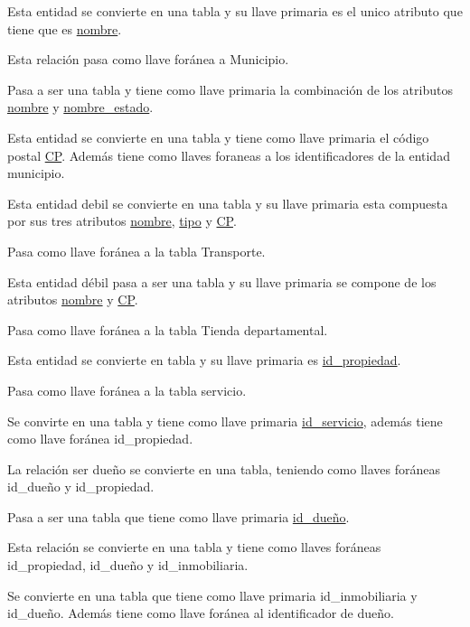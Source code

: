 \documentclass[10pt]{article}
\begin{document}
    \begin{description}[leftmargin=9em,style=nextline]
    	\item[Estado] Esta entidad se convierte en una tabla y su llave primaria es el unico atributo que tiene que es \underline{nombre}.
    	\item[Estar] Esta relación pasa como llave foránea a Municipio. 
    	\item[Municipio] Pasa a ser una tabla y tiene como llave primaria la combinación de los atributos \underline{nombre} y \underline{nombre\_estado}.
    	\item[Colonia]  Esta entidad se convierte en una tabla y tiene como llave primaria el código postal \underline{CP}. Además tiene como llaves foraneas a los identificadores de la entidad municipio.
    	\item[Transporte] Esta entidad debil se convierte en una tabla y su llave primaria esta compuesta por sus tres atributos \underline{nombre}, \underline{tipo} y \underline{CP}.
    	\item[Tener transporte] Pasa como llave foránea a la tabla Transporte.
    	\item[Tienda departamental] Esta entidad débil pasa a ser una tabla y su llave primaria se compone de los atributos \underline{nombre} y \underline{CP}.
    	\item[Tener tienda] Pasa como llave foránea a la tabla Tienda departamental.
    	\item[Propiedad] Esta entidad se convierte en tabla y su llave primaria es \underline{id\_propiedad}.
    	\item[Contar] Pasa como llave foránea a la tabla servicio.
    	\item[Servicio] Se convirte en una tabla y tiene como llave primaria \underline{id\_servicio}, además tiene como llave foránea id\_propiedad.
        \item[Ser dueño] La relación ser dueño se convierte en una tabla, teniendo como llaves foráneas id\_dueño y id\_propiedad.
   	    \item[Dueño] Pasa a ser una tabla que tiene como llave primaria \underline{id\_dueño}.
   	    \item[Revender] Esta relación se convierte en una tabla y tiene como llaves foráneas id\_propiedad, id\_dueño y id\_inmobiliaria.
   	    \item[Inmbobiliaria] Se convierte en una tabla que tiene como llave primaria id\_inmobiliaria y id\_dueño. Además tiene como llave foránea al identificador de dueño.

\end{description}
\end{document}
